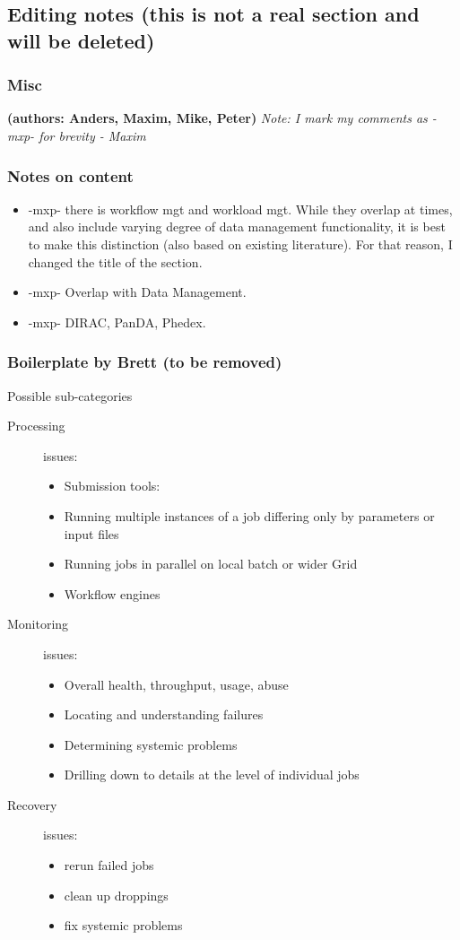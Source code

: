 \subsection{Editing notes (this is not a real section and will be deleted)}
\subsubsection{Misc}
\textbf{(authors: Anders, Maxim, Mike, Peter)} \textit{Note: I mark my comments as -mxp- for brevity - Maxim}

\subsubsection{Notes on content}

\begin{itemize}
\item -mxp- there is workflow mgt and workload mgt. While they overlap at times, and also include varying degree of data management functionality, it is best to make this distinction (also based on existing literature). For that reason, I changed the title of the section.
\item -mxp- Overlap with Data Management.
\item -mxp- DIRAC, PanDA, Phedex.

\end{itemize}


\subsubsection{Boilerplate by Brett (to be removed)}
Possible sub-categories
\begin{description}
\item[Processing] issues:

  \begin{itemize}
  \item Submission tools:
  \item Running multiple instances of a job differing only by parameters or input files
  \item Running jobs in parallel on local batch or wider Grid
  \item Workflow engines
  \end{itemize}
\item[Monitoring] issues:
  \begin{itemize}
  \item Overall health, throughput, usage, abuse
  \item Locating and understanding failures
  \item Determining systemic problems
  \item Drilling down to details at the level of individual jobs
  \end{itemize}
\item[Recovery] issues:
  \begin{itemize}
  \item rerun failed jobs
  \item clean up droppings
  \item fix systemic problems
  \end{itemize}
\end{description}